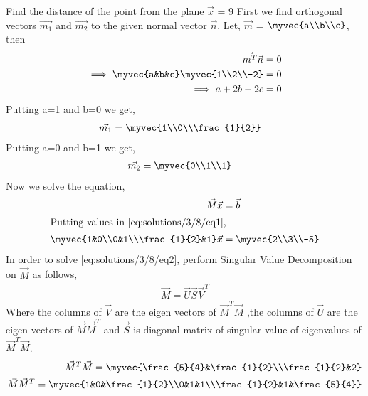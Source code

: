 
Find the distance of the point  from the plane $\vec{x}$ = 9
First we find orthogonal vectors $\vec{m_1}$ and $\vec{m_2}$ to the given normal vector $\vec{n}$. Let, $\vec{m}$ = $\myvec{a\\b\\c}$, then
\begin{align}
\vec{m^T}\vec{n} &= 0\\
\implies\myvec{a&b&c}\myvec{1\\2\\-2} &= 0\\
\implies a+2b-2c &= 0
\end{align}
Putting a=1 and b=0 we get,
\begin{align}
\vec{m_1} &= \myvec{1\\0\\\frac{1}{2}}\end{align}
Putting a=0 and b=1 we get,
\begin{align}
\vec{m_2} &= \myvec{0\\1\\1}
\end{align}
Now we solve the equation,
\begin{align}
\vec{M}\vec{x} &= \vec{b}\label{eq:solutions/3/8/eq1}\\
\intertext{Putting values in \eqref{eq:solutions/3/8/eq1},}
\myvec{1&0\\0&1\\\frac{1}{2}&1}\vec{x} &= \myvec{2\\3\\-5}\label{eq:solutions/3/8/eq2}
\end{align}
In order to solve \eqref{eq:solutions/3/8/eq2},  perform Singular Value Decomposition on $\vec{M}$ as follows,
\begin{align}
\vec{M}=\vec{U}\vec{S}\vec{V}^T\label{eq:solutions/3/8/eq100}
\end{align}
Where the columns of $\vec{V}$ are the eigen vectors of $\vec{M}^T\vec{M}$ ,the columns of $\vec{U}$ are the eigen vectors of $\vec{M}\vec{M}^T$ and $\vec{S}$ is diagonal matrix of singular value of eigenvalues of $\vec{M}^T\vec{M}$.
\begin{align}
\vec{M}^T\vec{M}=\myvec{\frac{5}{4}&\frac{1}{2}\\\frac{1}{2}&2}\label{eq:solutions/3/8/eqMTM}\\
\vec{M}\vec{M}^T=\myvec{1&0&\frac{1}{2}\\0&1&1\\\frac{1}{2}&1&\frac{5}{4}}
\end{align}
